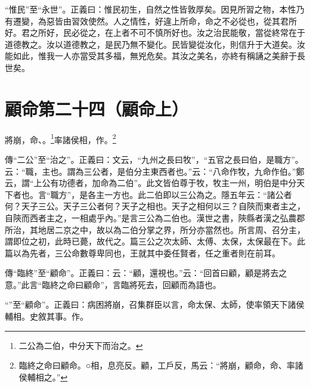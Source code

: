 {\noindent\shu{}\fzkt “惟民”至“永世”。正義曰：惟民初生，自然之性皆敦厚矣。因見所習之物，本性乃有遷變，為惡皆由習效使然。人之情性，好違上所命，命之不必從也，從其君所好。君之所好，民必從之，在上者不可不慎所好也。汝之治民能敬，當從終常在于道德教之。汝以道德教之，是民乃無不變化。民皆變從汝化，則信升于大道矣。汝能如此，惟我一人亦當受其多福，無兇危矣。其汝之美名，亦終有稱誦之美辭于長世矣。 \par}

\section{顧命第二十四（顧命上）}


將崩，命、。\footnote{二公為二伯，中分天下而治之。}率諸侯相，作。\footnote{臨終之命曰顧命。○相，息亮反。顧，工戶反，馬云：“將崩，顧命，命、率諸侯輔相之。”}


{\noindent\zhuan{}\fzbyks 傳“二公”至“治之”。正義曰：文云，“九州之長曰牧”，“五官之長曰伯，是職方”。云：“職，主也。謂為三公者，是伯分主東西者也。”云：“八命作牧，九命作伯。”鄭云，謂“上公有功德者，加命為二伯”。此文皆伯尊于牧，牧主一州，明伯是中分天下者也。言“職方”，是各主一方也。此二伯即以三公為之。隱五年云：“諸公者何？天子三公。天子三公者何？天子之相也。天子之相何以三？自陝而東者主之，自陝而西者主之，一相處乎內。”是言三公為二伯也。漢世之書，陝縣者漢之弘農郡所治，其地居二京之中，故以為二伯分掌之界，所分亦當然也。所言周、召分主，謂即位之初，此時已薨，故代之。篇三公之次太師、太傅、太保，太保最在下。此篇以為先者，三公命數尊卑同也，王就其中委任賢者，任之重者則在前耳。 \par}

{\noindent\zhuan{}\fzbyks 傳“臨終”至“顧命”。正義曰：云：“顧，還視也。”云：“回首曰顧，顧是將去之意。”此言“臨終之命曰顧命”，言臨將死去，回顧而為語也。 \par}

{\noindent\shu{}\fzkt “”至“顧命”。正義曰：病困將崩，召集群臣以言，命太保、太師，使率領天下諸侯輔相。史敘其事。作。 \par}

